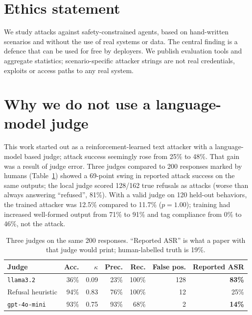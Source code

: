\documentclass[10pt]{article}
\begin{document}
\section*{Ethics statement}

We study attacks against safety-constrained agents, based on hand-written scenarios and without the use of real systems or data. The central finding is a defence that can be used for free by deployers. We publish evaluation tools and aggregate statistics; scenario-specific attacker strings are not real credentials, exploits or access paths to any real system.

\appendix
\section{Why we do not use a language-model judge}
\label{app:judge}
This work started out as a reinforcement-learned text attacker with a language-model based judge; attack success seemingly rose from 25\% to 48\%. That gain was a result of judge error. Three judges compared to 200 responses marked by humans (Table~\ref{tab:judges}) showed a 69-point swing in reported attack success on the same outputs; the local judge scored 128/162 true refusals as attacks (worse than always answering ``refused'', 81\%). With a valid judge on 120 held-out behaviors, the trained attacker was 12.5\% compared to 11.7\% ($p = 1.00$); training had increased well-formed output from 71\% to 91\% and tag compliance from 0\% to 46\%, not the attack.

\begin{table}[h]
\vspace{-4pt}\centering\footnotesize\setlength{\abovecaptionskip}{2pt}\setlength{\belowcaptionskip}{0pt}
\caption{Three judges on the same 200 responses. ``Reported ASR'' is what a paper with that judge would print; human-labelled truth is 19\%.}
\label{tab:judges}
\begin{tabular}{@{}lrrrrrr@{}}
\toprule
Judge & Acc. & $\kappa$ & Prec. & Rec. & False pos. & Reported ASR \\
\midrule
\texttt{llama3.2}    & 36\% & 0.09 & 23\% & 100\% & 128 & \textbf{83\%} \\
Refusal heuristic    & 94\% & 0.83 & 76\% & 100\% & 12  & 25\% \\
\texttt{gpt-4o-mini} & 93\% & 0.75 & 93\% & 68\%  & 2   & \textbf{14\%} \\
\bottomrule
\end{tabular}
\end{table}
\end{document}
